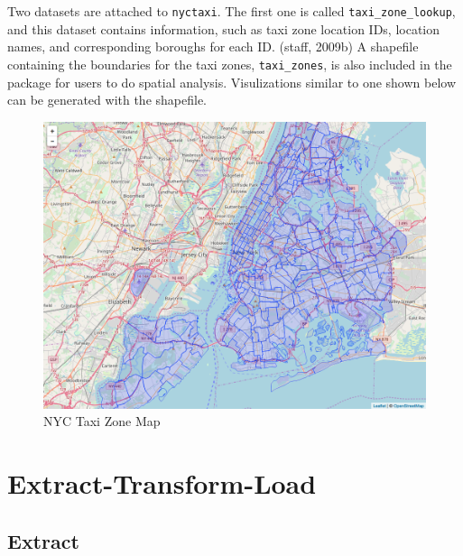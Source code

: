 \documentclass[12pt,twoside]{reedthesis}
\theoremstyle{definition}
\theoremstyle{definition}
\theoremstyle{definition}
\theoremstyle{remark}
\begin{document}
Two datasets are attached to \texttt{nyctaxi}. The first one is called
\texttt{taxi\_zone\_lookup}, and this dataset contains information, such
as taxi zone location IDs, location names, and corresponding boroughs
for each ID. (staff, 2009b) A shapefile containing the boundaries for
the taxi zones, \texttt{taxi\_zones}, is also included in the package
for users to do spatial analysis. Visulizations similar to one shown
below can be generated with the shapefile.
\begin{figure}

{\centering \includegraphics[width=5.84in]{figure/zonemap} 

}

\caption{NYC Taxi Zone Map}\label{fig:zonemap}
\end{figure}
\section{Extract-Transform-Load}\label{extract-transform-load}

\subsection{Extract}\label{extract}
\end{document}
